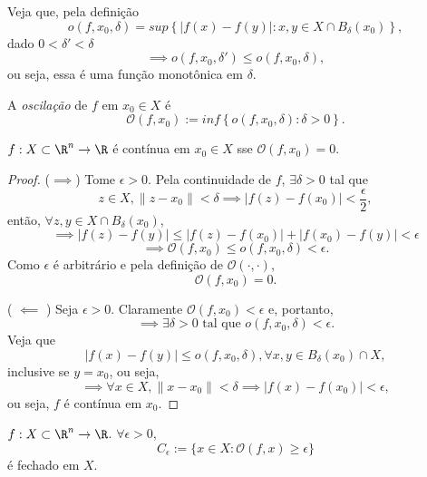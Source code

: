 \begin{observe}
    Veja que, pela definição \[
    o\left( f,x_0,\delta \right) = sup \left\{ \left| f\left( x \right) -f\left( y \right)  \right| : x,y \in  X\cap B_\delta \left( x_0 \right)  \right\} 
    ,\] dado $0<\delta'<\delta$ \[
    \implies o\left( f,x_0,\delta' \right) \le o\left( f,x_0,\delta \right)
    ,\] ou seja, essa é uma função monotônica em $\delta$.
\end{observe}

\begin{definition}
    A \emph{oscilação} de $f$ em $x_0\in X$ é \[
    \mathcal{O}\left( f,x_0 \right) := inf \left\{ o\left( f, x_0,\delta \right): \delta>0 \right\}
    .\] 
\end{definition}

\begin{prop}
    $f: X\subset \R^{n}\to \R$ é contínua em $x_0 \in X$ sse $\mathcal{O}\left( f, x_0 \right) =0$.
\end{prop}

\begin{proof}
    ($\implies$)
    Tome $\epsilon>0$. Pela continuidade de $f$, $\exists \delta > 0$ tal que \[
	z\in X, \|z-x_0\|<\delta \implies \left| f\left( z \right) -f\left( x_0 \right)\right|  < \frac{\epsilon}{2} 
    ,\] então, $\forall z,y \in  X \cap B_\delta\left( x_0 \right) $, \[
    \implies \left| f\left( z \right) -f\left( y \right)  \right| \le  \left| f\left( z \right) -f\left( x_0 \right)  \right| + \left| f\left( x_0 \right) -f\left( y \right)  \right| < \epsilon
    \] \[
    \implies \mathcal{O}\left( f, x_0 \right) \le o\left( f, x_0, \delta \right) <  \epsilon
    .\] Como $\epsilon$ é arbitrário e pela definição de $\mathcal{O}\left( \cdot , \cdot  \right) $, \[
    \mathcal{O}\left( f, x_0 \right) = 0
    .\] 

    ( $\impliedby $ ) 
    Seja $\epsilon>0$. Claramente $\mathcal{O}\left( f,x_0 \right) <\epsilon$ e, portanto,  \[
    \implies\exists \delta>0 \text{ tal que } o\left( f,x_0,\delta \right) < \epsilon
    .\] Veja que \[
    \left| f\left( x \right) -f\left( y \right)  \right| \le o\left(  f,x_0,\delta\right) , \forall x,y \in B_{\delta}\left( x_0 \right) \cap X
    ,\] inclusive se $y=x_0$, ou seja, \[
    \implies \forall x\in X, \|x-x_0\| < \delta \implies \left| f\left( x \right) -f\left( x_0 \right)  \right| <\epsilon
    ,\] ou seja, $f$ é contínua em $x_0$.
\end{proof}

\begin{prop}
    $f:X\subset \R^{n}\to \R$. $\forall \epsilon>0$, \[
    C_{\epsilon} := \{x\in X : \mathcal{O}\left( f, x \right) \ge \epsilon\} 
    \] é fechado em $X$.
\end{prop}

